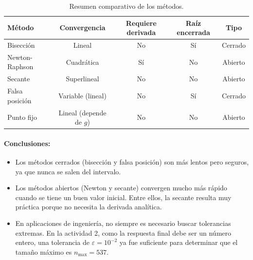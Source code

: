 \documentclass[11pt,a4paper]{article}
\begin{document}
\begin{table}[h!]
    \centering
    \caption{Resumen comparativo de los métodos.}
    \begin{tabular}{lcccc}
        \toprule
        Método & Convergencia & Requiere derivada & Raíz encerrada & Tipo \\
        \midrule
        Bisección       & Lineal & No & Sí & Cerrado \\
        Newton-Raphson  & Cuadrática & Sí & No & Abierto \\
        Secante         & Superlineal & No & No & Abierto \\
        Falsa posición  & Variable (lineal) & No & Sí & Cerrado \\
        Punto fijo      & Lineal (depende de $g$) & No & No & Abierto \\
        \bottomrule
    \end{tabular}
\end{table}

\paragraph{Conclusiones:}
\begin{itemize}[leftmargin=*]
    \item Los métodos cerrados (bisección y falsa posición) son más lentos pero seguros, ya que nunca se salen del intervalo.
    \item Los métodos abiertos (Newton y secante) convergen mucho más rápido cuando se tiene un buen valor inicial. Entre ellos, la secante resulta muy práctica porque no necesita la derivada analítica.
    \item En aplicaciones de ingeniería, no siempre es necesario buscar tolerancias extremas. En la actividad 2, como la respuesta final debe ser un número entero, una tolerancia de $\varepsilon = 10^{-2}$ ya fue suficiente para determinar que el tamaño máximo es $n_{\max} = 537$.
\end{itemize}
\end{document}

